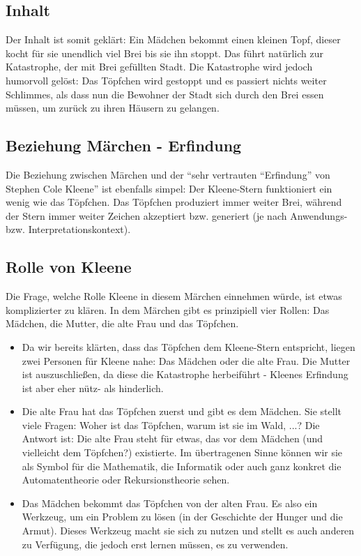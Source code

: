 \documentclass{article}
\begin{document}
\subsection*{Inhalt}
Der Inhalt ist somit geklärt: Ein Mädchen bekommt einen kleinen Topf, dieser kocht für sie unendlich viel Brei bis sie ihn stoppt. Das führt natürlich zur Katastrophe, der mit Brei gefüllten Stadt. Die Katastrophe wird jedoch humorvoll gelöst: Das Töpfchen wird gestoppt und es passiert nichts weiter Schlimmes, als dass nun die Bewohner der Stadt sich durch den Brei essen müssen, um zurück zu ihren Häusern zu gelangen.

\subsection*{Beziehung Märchen - Erfindung}
Die Beziehung zwischen Märchen und der "`sehr vertrauten "`Erfindung"' von Stephen Cole Kleene"' ist ebenfalls simpel: 
Der Kleene-Stern funktioniert ein wenig wie das Töpfchen. Das Töpfchen produziert immer weiter Brei, während der Stern immer weiter Zeichen akzeptiert bzw. generiert (je nach Anwendungs- bzw. Interpretationskontext). 

\subsection*{Rolle von Kleene}
Die Frage, welche Rolle Kleene in diesem Märchen einnehmen würde, ist etwas komplizierter zu klären. In dem Märchen gibt es prinzipiell vier Rollen: Das Mädchen, die Mutter, die alte Frau und das Töpfchen. 
\begin{itemize}
	\item Da wir bereits klärten, dass das Töpfchen dem Kleene-Stern entspricht, liegen zwei Personen für Kleene nahe: Das Mädchen oder die alte Frau. Die Mutter ist auszuschließen, da diese die Katastrophe herbeiführt - Kleenes Erfindung ist aber eher nütz- als hinderlich.
  \item Die alte Frau hat das Töpfchen zuerst und gibt es dem Mädchen. Sie stellt viele Fragen: Woher ist das Töpfchen, warum ist sie im Wald, ...? Die Antwort ist: Die alte Frau steht für etwas, das vor dem Mädchen (und vielleicht dem Töpfchen?) existierte. Im übertragenen Sinne können wir sie als Symbol für die Mathematik, die Informatik oder auch ganz konkret die Automatentheorie oder Rekursionstheorie sehen. 
  \item Das Mädchen bekommt das Töpfchen von der alten Frau. Es also ein Werkzeug, um ein Problem zu lösen (in der Geschichte der Hunger und die Armut). Dieses Werkzeug macht sie sich zu nutzen und stellt es auch anderen zu Verfügung, die jedoch erst lernen müssen, es zu verwenden. 
\end{itemize}
\end{document}

